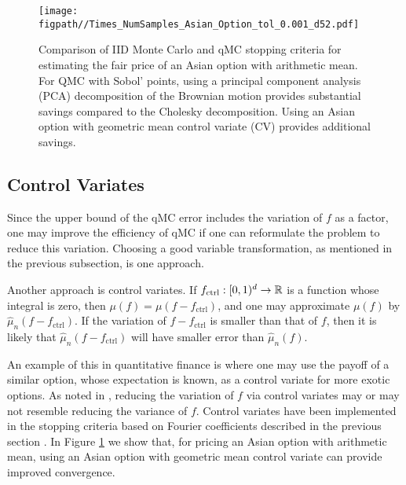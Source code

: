 \documentclass{svproc}
\newcommand{\figpath}{Figures}
\begin{document}
\begin{figure}
	\centering
    \texttt{[image: \\figpath//Times\_NumSamples\_Asian\_Option\_tol\_0.001\_d52.pdf]}
	\caption{Comparison of IID Monte Carlo and qMC stopping criteria for estimating the fair price of an Asian option with arithmetic mean. For QMC with Sobol' points, using a principal component analysis (PCA) decomposition of the Brownian motion provides substantial savings compared to the Cholesky decomposition. Using an Asian option with geometric mean control variate (CV) provides additional savings. \label{fig:asian_option_pda_vs_chol}}
\end{figure}

\subsection{Control Variates} 

Since the upper bound of the qMC error includes the variation of $f$ as a factor, one may improve the efficiency of qMC if one can reformulate the problem to reduce this variation.  Choosing a good variable transformation, as mentioned in the previous subsection, is one approach.  

Another approach is control variates.  If $f_{\text{ctrl}} : [0,1)^d \to {\mathbb{R}}$ is a function whose integral is zero, then $\mu(f) = \mu(f - f_{\text{ctrl}})$, and one may approximate $\mu(f)$ by $\hat{\mu}_n(f - f_{\text{ctrl}})$.  If the variation of  $f - f_{\text{ctrl}}$ is smaller than that of $f$, then it is likely that $\hat{\mu}_n(f - f_{\text{ctrl}})$ will have smaller error than $\hat{\mu}_n(f)$. 

An example of this in quantitative finance is where one may use the payoff of a similar option, whose expectation is known, as a control variate for more exotic options.  As noted in \cite{HicEtal03}, reducing the variation of $f$ via control variates may or may not resemble reducing the variance of $f$.  Control variates have been implemented in the stopping criteria based on Fourier coefficients described in the previous section \cite{HicEtal17a}. In Figure \ref{fig:asian_option_pda_vs_chol} we show that, for pricing an Asian option with arithmetic mean, using an Asian option with geometric mean control variate can provide improved convergence.
\end{document}
